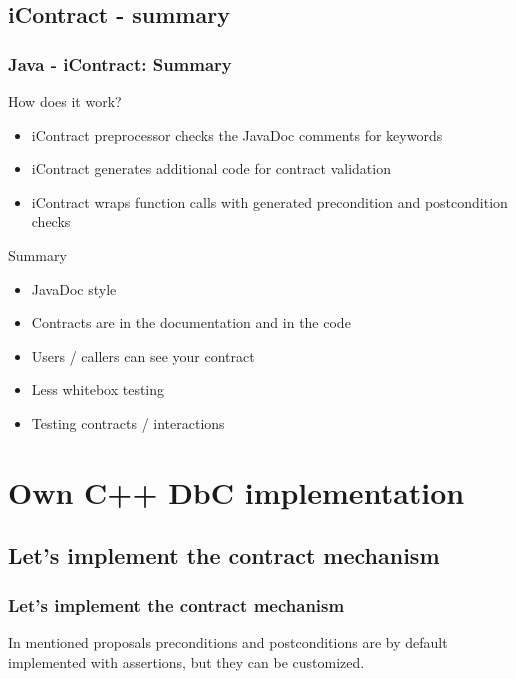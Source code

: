 \documentclass{beamer}
\begin{document}
\subsection{iContract - summary}
\begin{frame}
\frametitle{Java - iContract: Summary}
\begin{block}{How does it work?}
\begin{itemize}[<+->]
  \item iContract preprocessor checks the JavaDoc comments for keywords
  \item iContract generates additional code for contract validation
  \item iContract wraps function calls with generated precondition and postcondition checks
\end{itemize}
\end{block}
\pause
\begin{block}{Summary}
\begin{itemize}[<+->]
  \item JavaDoc style
  \item Contracts are in the documentation and in the code
  \item Users / callers can see your contract
  \item Less whitebox testing
  \item Testing contracts / interactions
\end{itemize}
\end{block}
\end{frame}




\section{Own C++ DbC implementation}
\begin{frame}
\sectionpage
\end{frame}

\subsection{Let's implement the contract mechanism}
\begin{frame}[fragile]
\frametitle{Let's implement the contract mechanism}

\begin{block}{}
In mentioned proposals preconditions and postconditions are by default implemented with assertions, but they can be customized.
\end{block}
\pause

\end{frame}
\end{document}
